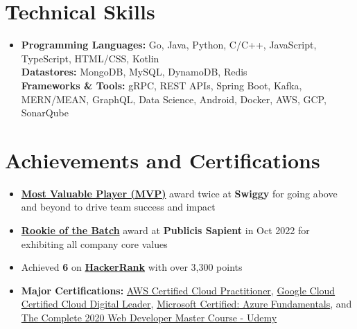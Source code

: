\documentclass[letterpaper,13pt]{article}
\newcommand{\resumeItem}[1]{
  \item\small{
    {#1 \vspace{-2pt}}
  }
}
\newcommand{\resumeItemListStart}{\begin{itemize}}
\newcommand{\resumeItemListEnd}{\end{itemize}\vspace{-7pt}}
\begin{document}
\section{Technical Skills}
 \begin{itemize}[leftmargin=0.15in, label={}]
    \item{
     \textbf{Programming Languages: }{Go, Java, Python, C/C++, JavaScript, TypeScript, HTML/CSS, Kotlin} \\
     \textbf{Datastores: }{MongoDB, MySQL, DynamoDB, Redis} \\
     \textbf{Frameworks \& Tools: }{gRPC, REST APIs, Spring Boot, Kafka, MERN/MEAN, GraphQL, Data Science, Android, Docker, AWS, GCP, SonarQube} 
    }
 \end{itemize}

\section{Achievements and Certifications}
  \resumeItemListStart      
\resumeItem{\href{https://drive.google.com/file/d/16kl63FbmVBjhNibiJ1LzKRyyKQI73X5e/view?usp=sharing}{\textbf{Most Valuable Player (MVP)}} award twice at \textbf{Swiggy} for going above and beyond to drive team success and impact}
\resumeItem{\href{https://drive.google.com/file/d/1U9yLcTbFNVLfGm9tHbY7JiOYqgzFtAvm/view?usp=drive_link&usp=embed_facebook}{\textbf{Rookie of the Batch}} award at \textbf{Publicis Sapient} in Oct 2022 for exhibiting all company core values}
  \resumeItem{Achieved \textbf{6 \faStar} on \href{https://www.hackerrank.com/profile/JayantGoel001}{\textbf{HackerRank}} with over 3,300 points}
  \resumeItem{\textbf{Major Certifications:} \href{https://drive.google.com/file/d/15qgH3MU0gf9ww9uZuMcu4e2ezFcTaZK1/view?usp=drive_link}{AWS Certified Cloud Practitioner}, \href{https://drive.google.com/file/d/1gxAfbcVD6_U8mtxzcrPHf1gZmZ5Z20xh/view?usp=drive_link}{Google Cloud Certified Cloud Digital Leader}, \href{https://drive.google.com/file/d/1_ghen3KbDJKEgsdudfGRUg77y8ytYC3L/view?usp=drive_link}{Microsoft Certified: Azure Fundamentals}, and
      \href{https://drive.google.com/file/d/12THg9_3-KtjSRe7pLfw27_pqwkDtSQMx/view?usp=drive_link}{The Complete 2020 Web Developer Master Course - Udemy}
      }
  \resumeItemListEnd
\end{document}
